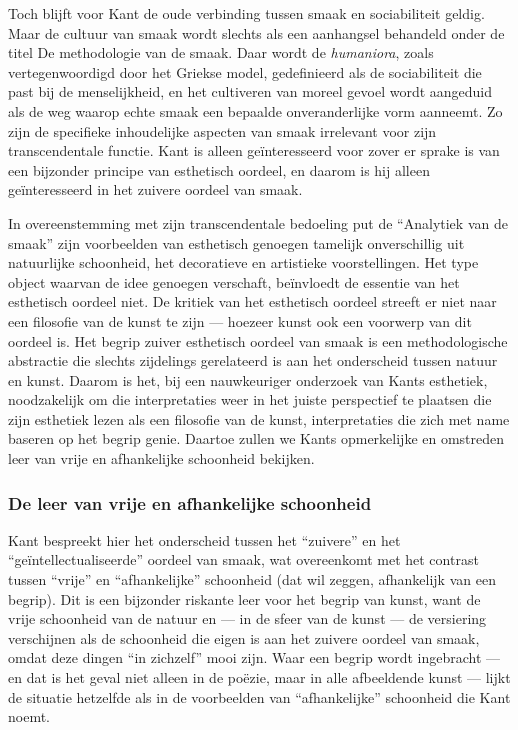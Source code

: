 Toch blijft voor Kant de oude verbinding tussen smaak en sociabiliteit geldig. Maar de cultuur van smaak wordt slechts als een aanhangsel behandeld onder de titel De methodologie van de smaak. Daar wordt de \textit{humaniora}, zoals vertegenwoordigd door het Griekse model, gedefinieerd als de sociabiliteit die past bij de menselijkheid, en het cultiveren van moreel gevoel wordt aangeduid als de weg waarop echte smaak een bepaalde onveranderlijke vorm aanneemt. Zo zijn de specifieke inhoudelijke aspecten van smaak irrelevant voor zijn transcendentale functie. Kant is alleen geïnteresseerd voor zover er sprake is van een bijzonder principe van esthetisch oordeel, en daarom is hij alleen geïnteresseerd in het zuivere oordeel van smaak.

In overeenstemming met zijn transcendentale bedoeling put de ``Analytiek van de smaak'' zijn voorbeelden van esthetisch genoegen tamelijk onverschillig uit natuurlijke schoonheid, het decoratieve en artistieke voorstellingen. Het type object waarvan de idee genoegen verschaft, beïnvloedt de essentie van het esthetisch oordeel niet. De kritiek van het esthetisch oordeel streeft er niet naar een filosofie van de kunst te zijn — hoezeer kunst ook een voorwerp van dit oordeel is. Het begrip zuiver esthetisch oordeel van smaak is een methodologische abstractie die slechts zijdelings gerelateerd is aan het onderscheid tussen natuur en kunst. Daarom is het, bij een nauwkeuriger onderzoek van Kants esthetiek, noodzakelijk om die interpretaties weer in het juiste perspectief te plaatsen die zijn esthetiek lezen als een filosofie van de kunst, interpretaties die zich met name baseren op het begrip genie. Daartoe zullen we Kants opmerkelijke en omstreden leer van vrije en afhankelijke schoonheid bekijken.

\subsubsection{De leer van vrije en afhankelijke schoonheid}

Kant bespreekt hier het onderscheid tussen het ``zuivere'' en het ``geïntellectualiseerde'' oordeel van smaak, wat overeenkomt met het contrast tussen ``vrije'' en ``afhankelijke'' schoonheid (dat wil zeggen, afhankelijk van een begrip). Dit is een bijzonder riskante leer voor het begrip van kunst, want de vrije schoonheid van de natuur en — in de sfeer van de kunst — de versiering verschijnen als de schoonheid die eigen is aan het zuivere oordeel van smaak, omdat deze dingen ``in zichzelf'' mooi zijn. Waar een begrip wordt ingebracht — en dat is het geval niet alleen in de poëzie, maar in alle afbeeldende kunst — lijkt de situatie hetzelfde als in de voorbeelden van ``afhankelijke'' schoonheid die Kant noemt.

